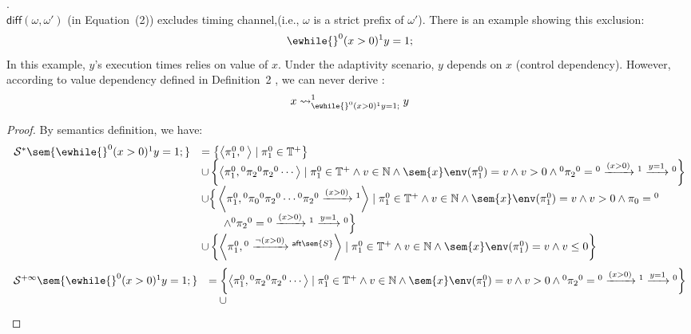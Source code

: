  \clearpage
 \begin{example}.
 \label{ex:excltiming}
 \\
 $\mathsf{diff}(\omega, \omega')$ (in \cite{cousot2019abstract} Equation~(2)) excludes timing channel,(i.e., $\omega$ is a strict prefix of $\omega'$). There is an example showing this exclusion: 
 \[
 	\ewhile {}^0 (x > 0) {}^1 y = 1;
 \]
 In this example, $y$'s execution times relies on value of $x$. Under the adaptivity scenario, $y$ depends on $x$ (control dependency).
 However, according to value dependency defined in Definition~2 \cite{cousot2019abstract}, we can never derive :
 \[
 	x \rightsquigarrow^{1}_{\ewhile {}^0 (x > 0) {}^1  y = 1;} y
 \]
 \begin{proof}
 By semantics definition, we have:
 \[
 \begin{array}{ll}
 \mathcal{S}^{*} \sem{ \ewhile {}^0 (x > 0) {}^1 y = 1; } 
 & =  \left\{ \left< \pi_1^0, ^0\right> \mid \pi_1^0 \in \mathbb{T^{+}} \right\}
 \\ &  \cup 
 \left\{ \left< \pi_1^0, {}^0 \pi_2 {}^0 \pi_2 {}^0\cdots \right>
 \mid \pi_1^0 \in \mathbb{T^{+}} \land v \in \mathbb{N} \land
 \sem{x}\env(\pi_1^0) = v
 \land v > 0  \land
 {}^0 \pi_2 {}^0 = {}^0 \xrightarrow{(x > 0)} {}^1 \xrightarrow{y = 1} {}^0
 \right\}
 \\ &  \cup 
 \Big\{ \left< \pi_1^0, {}^0 \pi_0 {}^0 \pi_2 {}^0 \cdots {}^0 \pi_2 {}^0 \xrightarrow{(x > 0)} {}^1 \right>
 \mid \pi_1^0 \in \mathbb{T^{+}} \land v \in \mathbb{N} \land
 \sem{x}\env(\pi_1^0) = v
 \land v > 0 \land 
 \pi_0 = {}^0  
 \\ & \qquad \land
 {}^0 \pi_2 {}^0 = {}^0 \xrightarrow{(x > 0)} {}^1 \xrightarrow{y = 1} {}^0
 \Big\}
 \\ & \cup 
 \left\{ \left< \pi_1^0, {}^0 \xrightarrow{\neg(x > 0)} {}^{\mathsf{aft}\sem{S}} \right> 
 \mid \pi_1^0 \in \mathbb{T^{+}} \land v \in \mathbb{N} \land
  \sem{x}\env(\pi_1^0) = v
 \land v \leq 0 \right\}
 \end{array}
 \]
 \begin{equation}
 \label{eq:sem_timingdep}
 \begin{array}{ll}
\mathcal{S}^{+\infty} \sem{ \ewhile {}^0 (x > 0) {}^1 y = 1; } 
& =  
 \left\{ \left< \pi_1^0, {}^0 \pi_2 {}^0 \pi_2 {}^0\cdots \right>
 \mid \pi_1^0 \in \mathbb{T^{+}} \land v \in \mathbb{N} \land
 \sem{x}\env(\pi_1^0) = v
 \land v > 0  \land
 {}^0 \pi_2 {}^0 = {}^0 \xrightarrow{(x > 0)} {}^1 \xrightarrow{y = 1} {}^0
 \right\}
 \\ & \quad \cup 

\end{array}
\end{equation}
\end{proof}
\end{example}
